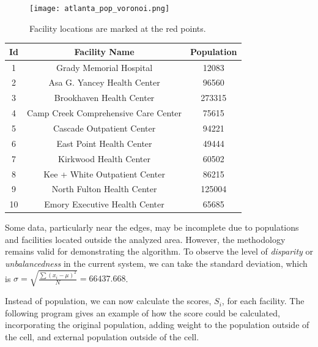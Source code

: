 \documentclass{article}
\begin{document}
\begin{figure}[H]
    \centering
    \captionsetup{justification=centering,width=.9\linewidth}
    \captionsetup{justification=centering}
    \texttt{[image: atlanta\_pop\_voronoi.png]}
    \caption{Facility locations are marked at the red points.}
    \label{fig:final-interface}
\end{figure}
\begin{center}
\begin{tabular}{ | c | c | c | }
 \hline
 Id & Facility Name & Population \\
 \hline
 1 & Grady Memorial Hospital & 12083 \\ 
 2 & Asa G. Yancey Health Center & 96560 \\  
 3 & Brookhaven Health Center & 273315 \\
 4 & Camp Creek Comprehensive Care Center & 75615 \\
 5 & Cascade Outpatient Center & 94221 \\
 6 & East Point Health Center & 49444 \\
 7 & Kirkwood Health Center & 60502 \\
 8 & Kee + White Outpatient Center & 86215 \\
 9 & North Fulton Health Center & 125004 \\
 10 & Emory Executive Health Center & 65685 \\
 \hline
\end{tabular}
\end{center}

\vspace{12}
Some data, particularly near the edges, may be incomplete due to populations and facilities located outside the analyzed area. However, the methodology remains valid for demonstrating the algorithm. To observe the level of \textit{disparity} or \textit{unbalancedness} in the current system, we can take the standard deviation, which is $\sigma = \sqrt{\frac{\sum(x_i - \mu)^2}{N}} = \mathbf{66437.668}$.

Instead of population, we can now calculate the scores, $S_i$, for each facility. The following program gives an example of how the score could be calculated, incorporating the original population, adding weight to the population outside of the cell, and external population outside of the cell.

\vspace{12}
\end{document}
